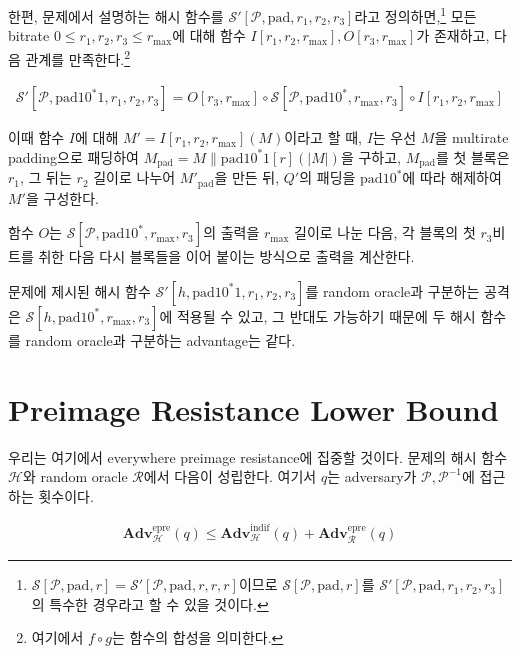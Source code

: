 \documentclass{article}
\newcommand{\adv}{\mathbf{Adv}}
\begin{document}
  한편, 문제에서 설명하는 해시 함수를 \(\mathcal{S}'[\mathcal{P}, \mathrm{pad}, r_1, r_2, r_3]\)라고 정의하면,\footnote{\(\mathcal{S}[\mathcal{P}, \mathrm{pad}, r] = \mathcal{S}'[\mathcal{P}, \mathrm{pad}, r, r, r]\)이므로 \(\mathcal{S}[\mathcal{P}, \mathrm{pad}, r]\)를 \(\mathcal{S}'[\mathcal{P}, \mathrm{pad}, r_1, r_2, r_3]\)의 특수한 경우라고 할 수 있을 것이다.} 모든 bitrate \(0 \leq r_1, r_2, r_3 \leq r_\mathrm{max}\)에 대해 함수 \(I[r_1, r_2, r_\mathrm{max}], O[r_3, r_\mathrm{max}]\)가 존재하고, 다음 관계를 만족한다.\footnote{여기에서 \(f \circ g\)는 함수의 합성을 의미한다.}

  \begin{align*}
    \mathcal{S}'[\mathcal{P}, \mathrm{pad10^*1}, r_1, r_2, r_3] = O[r_3, r_\mathrm{max}] \circ \mathcal{S}[\mathcal{P}, \mathrm{pad10^*}, r_\mathrm{max}, r_3] \circ I[r_1, r_2, r_\mathrm{max}]
  \end{align*}

  이때 함수 \(I\)에 대해 \(M' = I[r_1, r_2, r_\mathrm{max}](M)\)이라고 할 때, \(I\)는 우선 \(M\)을 multirate padding으로 패딩하여 \(M_\mathrm{pad} = M \| \mathrm{pad10^*1}[r](|M|)\)을 구하고, \(M_\mathrm{pad}\)를 첫 블록은 \(r_1\), 그 뒤는 \(r_2\) 길이로 나누어 \(M'_\mathrm{pad}\)을 만든 뒤, \(Q'\)의 패딩을 \(\mathrm{pad10^*}\)에 따라 해제하여 \(M'\)을 구성한다.

  함수 \(O\)는 \(\mathcal{S}[\mathcal{P}, \mathrm{pad10^*}, r_\mathrm{max}, r_3]\)의 출력을 \(r_\mathrm{max}\) 길이로 나눈 다음, 각 블록의 첫 \(r_3\)비트를 취한 다음 다시 블록들을 이어 붙이는 방식으로 출력을 계산한다.

  문제에 제시된 해시 함수 \(\mathcal{S}'[h, \mathrm{pad10^*1}, r_1, r_2, r_3]\)를 random oracle과 구분하는 공격은 \(\mathcal{S}[h, \mathrm{pad10^*}, r_\mathrm{max}, r_3]\)에 적용될 수 있고, 그 반대도 가능하기 때문에 두 해시 함수를 random oracle과 구분하는 advantage는 같다.

  \section{Preimage Resistance Lower Bound}
  우리는 여기에서 everywhere preimage resistance에 집중할 것이다.\cite{rogaway_cryptographic_2004} 문제의 해시 함수 \(\mathcal{H}\)와 random oracle \(\mathcal{R}\)에서 다음이 성립한다.\cite{andreeva_security_2011} 여기서 \(q\)는 adversary가 \(\mathcal{P}, \mathcal{P}^{-1}\)에 접근하는 횟수이다.

  \begin{align}\label{epre_adv_bound}
    \adv^\text{epre}_\mathcal{H}(q) \leq \adv^\text{indif}_\mathcal{H}(q) + \adv^\text{epre}_\mathcal{R}(q)
  \end{align}
\end{document}
